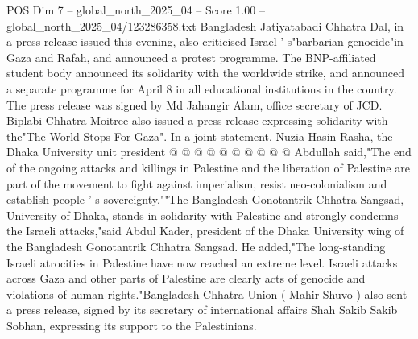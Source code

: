 \begin{textsample}{POS Dim 7 – global\_north\_2025\_04 – Score 1.00 – global\_north\_2025\_04/123286358.txt}
Bangladesh Jatiyatabadi Chhatra Dal, in a press release issued this evening, also criticised Israel ' s"barbarian genocide"in Gaza and Rafah, and announced a protest programme.
The BNP-affiliated student body announced its solidarity with the worldwide strike, and announced a separate programme for April 8 in all educational institutions in the country.
The press release was signed by Md Jahangir Alam, office secretary of JCD.
Biplabi Chhatra Moitree also issued a press release expressing solidarity with the"The World Stops For Gaza".
In a joint statement, Nuzia Hasin Rasha, the Dhaka University unit president @ @ @ @ @ @ @ @ @ @ Abdullah said,"The end of the ongoing attacks and killings in Palestine and the liberation of Palestine are part of the movement to fight against imperialism, resist neo-colonialism and establish people ' s sovereignty.""The Bangladesh Gonotantrik Chhatra Sangsad, University of Dhaka, stands in solidarity with Palestine and strongly condemns the Israeli attacks,"said Abdul Kader, president of the Dhaka University wing of the Bangladesh Gonotantrik Chhatra Sangsad.
He added,"The long-standing Israeli atrocities in Palestine have now reached an extreme level.
Israeli attacks across Gaza and other parts of Palestine are clearly acts of genocide and violations of human rights."Bangladesh Chhatra Union ( Mahir-Shuvo ) also sent a press release, signed by its secretary of international affairs Shah Sakib Sakib Sobhan, expressing its support to the Palestinians.

\end{textsample}
